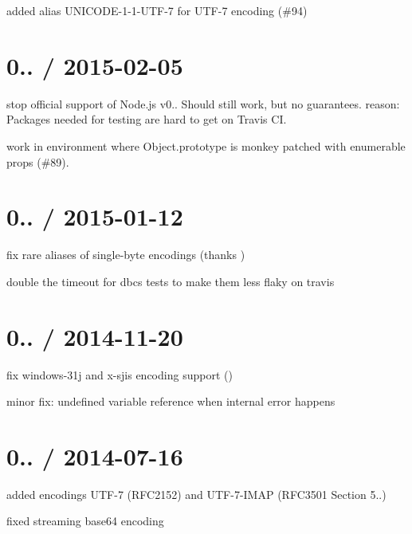 
\begin{DoxyItemize}
\item added alias U\+N\+I\+C\+O\+D\+E-\/1-\/1-\/\+U\+T\+F-\/7 for U\+T\+F-\/7 encoding (\#94)
\end{DoxyItemize}

\section*{0.. / 2015-\/02-\/05}


\begin{DoxyItemize}
\item stop official support of Node.\+js v0.. Should still work, but no guarantees. reason\+: Packages needed for testing are hard to get on Travis C\+I.
\item work in environment where Object.\+prototype is monkey patched with enumerable props (\#89).
\end{DoxyItemize}

\section*{0.. / 2015-\/01-\/12}


\begin{DoxyItemize}
\item fix rare aliases of single-\/byte encodings (thanks )
\item double the timeout for dbcs tests to make them less flaky on travis
\end{DoxyItemize}

\section*{0.. / 2014-\/11-\/20}


\begin{DoxyItemize}
\item fix windows-\/31j and x-\/sjis encoding support ()
\item minor fix\+: undefined variable reference when internal error happens
\end{DoxyItemize}

\section*{0.. / 2014-\/07-\/16}


\begin{DoxyItemize}
\item added encodings U\+T\+F-\/7 (R\+F\+C2152) and U\+T\+F-\/7-\/\+I\+M\+A\+P (R\+F\+C3501 Section 5..)
\item fixed streaming base64 encoding
\end{DoxyItemize}

